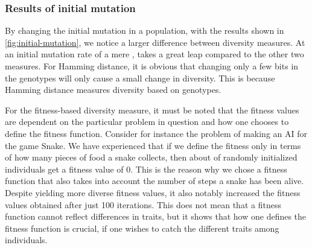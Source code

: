 \subsubsection{Results of initial mutation} By changing the initial mutation in a population, with the results shown in \cref{fig:initial-mutation}, we notice a larger difference between diversity measures. At an initial mutation rate of a mere , \dia{} takes a great leap compared to the other two measures. For Hamming distance, it is obvious that changing only a few bits in the genotypes will only cause a small change in diversity. This is because Hamming distance measures diversity based on genotypes.

For the fitness-based diversity measure, it must be noted that the fitness values are dependent on the particular problem in question and how one chooses to define the fitness function. Consider for instance the problem of making an AI for the game Snake. We have experienced that if we define the fitness only in terms of how many pieces of food a snake collects, then about  of randomly initialized individuals get a fitness value of 0. This is the reason why we chose a fitness function that also takes into account the number of steps a snake has been alive. Despite yielding more diverse fitness values, it also notably increased the fitness values obtained after just 100 iterations. This does not mean that a fitness function cannot reflect differences in traits, but it shows that how one defines the fitness function is crucial, if one wishes to catch the different traits among individuals.
%

